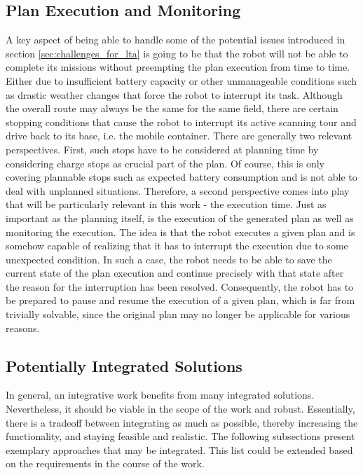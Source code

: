 \documentclass[english, master, expose, utf8]{base/thesis_KBS}
\begin{document}
\subsection{Plan Execution and Monitoring}

A key aspect of being able to handle some of the potential issues introduced in section \ref{sec:challenges_for_lta} is going to be that the robot will not be able to
complete its missions without preempting the plan execution from time to time. Either due to insufficient battery capacity or other unmanageable conditions such as 
drastic weather changes that force the robot to interrupt its task. Although the overall route may always be the same for the same field, there are certain stopping
conditions that cause the robot to interrupt its active scanning tour and drive back to its base, i.e. the mobile container.
There are generally two relevant perspectives. First, such stops have to be considered at planning time by considering charge stops as crucial part of the plan.
Of course, this is only covering plannable stops such as expected battery consumption and is not able to deal with unplanned situations.
Therefore, a second perspective comes into play that will be particularly relevant in this work - the execution time.
Just as important as the planning itself, is the execution of the generated plan as well as monitoring the execution.
The idea is that the robot executes a given plan and is somehow capable of realizing that it has to interrupt the execution due to some unexpected condition.
In such a case, the robot needs to be able to save the current state of the plan execution and continue precisely with that state after the reason 
for the interruption has been resolved. Consequently, the robot has to be prepared to pause and resume the execution of a given plan, which is far from 
trivially solvable, since the original plan may no longer be applicable for various reasons.

\subsection{Potentially Integrated Solutions}

In general, an integrative work benefits from many integrated solutions. Nevertheless, it should be viable in the scope of the work and robust.
Essentially, there is a tradeoff between integrating as much as possible, thereby increasing the functionality, and staying feasible and realistic.
The following subsections present exemplary approaches that may be integrated. This list could be extended based on the requirements in the course of the work.
\end{document}

